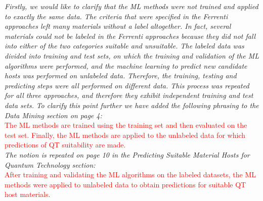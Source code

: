 \documentclass[11pt, a4paper]{letter} %
\newcommand{\mrk}[1]{\textcolor{red}{#1}}
\begin{document}
\textit{Firstly, we would like to clarify that the ML methods were not trained and applied to exactly the same data. The criteria that were specified in the Ferrenti approaches left many materials without a label altogether. 
In fact, several materials could not be labeled in the Ferrenti approaches because they did not fall into either of the two categories suitable and unsuitable. 
The labeled data was divided into training and test sets, on which the training and validation of the ML algorithms were performed, and the machine learning to predict new candidate hosts was performed on unlabeled data. Therefore, the training, testing and predicting steps were all performed on different data. This process was repeated for all three approaches, and therefore they exhibit independent training and test data sets.} 
\textit{To clarify this point further we have added the following phrasing to the Data Mining section on page 4:} \\ 
\mrk{The ML methods are trained using the training set and then evaluated on the test
set. Finally, the ML methods are applied to the unlabeled data for which predictions of QT suitability are made.} \\ 
\textit{The notion is repeated on page 10 in the Predicting Suitable Material Hosts for Quantum Technology section:} \\ 
\mrk{After training and validating the ML algorithms on the labeled datasets, the ML methods were applied to unlabeled
data to obtain predictions for suitable QT host materials.} 
\end{document}
